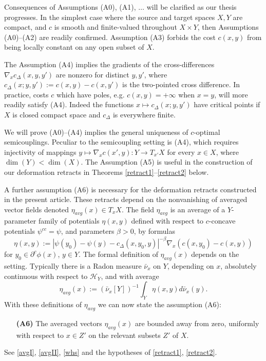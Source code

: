\documentclass[12pt]{amsart}
\theoremstyle{definition}
\theoremstyle{remark}
\newcommand{\del}{\partial}
\newcommand{\cd}{c_\Delta}
\begin{document}
Consequences of Assumptions (A0), (A1), $\ldots$ will be clarified as our thesis progresses. In the simplest case where the source and target spaces $X,Y$ are compact, and $c$ is smooth and finite-valued throughout $X\times Y$, then Assumptions (A0)--(A2) are readily confirmed. Assumption (A3) forbids the cost $c(x,y)$ from being locally constant on any open subset of $X$. 

The Assumption (A4) implies the gradients of the cross-differences $\nabla_x \cd(x,y,y')$ are nonzero for distinct $y,y'$, where $\cd(x;y, y'):=c(x,y)-c(x,y')$ is the two-pointed cross difference. In practice, costs $c$ which have poles, e.g. $c(x,y)=+\infty$ when $x=y$, will more readily satisfy (A4). Indeed the functions $x\mapsto \cd(x;y, y')$ have critical points if $X$ is closed compact space and $\cd$ is everywhere finite. 

We will prove (A0)--(A4) implies the general uniqueness of $c$-optimal semicouplings. Peculiar to the semicoupling setting is (A4), which requires injectivity of mappings $y\mapsto \nabla_x c(x',y):Y\to T_{x'} X$ for every $x\in X$, where $\dim(Y)< \dim(X)$. The Assumption (A5) is useful in the construction of our deformation retracts in Theorems \ref{retract1}--\ref{retract2} below. 

A further assumption (A6) is necessary for the deformation retracts constructed in the present article. These retracts depend on the nonvanishing of averaged vector fields denoted $\eta_{avg}(x) \in T_x X$. The field $\eta_{avg}$ is an average of a $Y$-parameter family of potentials $\eta(x,y)$ defined with respect to $c$-concave potentials $\psi^{cc}=\psi$, and parameters $\beta>0$, by formulas\begin{equation}\label{introetaavg}
\eta(x,y):=|\psi(y_0)-\psi(y)-\cd(x,y_0,y)|^{-\beta} \nabla_x (c(x,y_0)-c(x,y)) 
\end{equation} for $y_0\in \del^c \phi(x)$, $y\in Y$. %
The formal definition of $\eta_{avg}(x)$ depends on the setting. Typically there is a Radon measure $\bar{\nu}_x$ on $Y$, depending on $x$, absolutely continuous with respect to $\mathscr{H}_Y$, and with average \begin{equation}\label{introavg}
\eta_{avg}(x):=(\bar{\nu}_x[Y])^{-1} \int_Y \eta(x,y)d\bar{\nu}_x(y).
\end{equation}
With these definitions of $\eta_{avg}$ we can now state the assumption (A6): 
\begin{itemize}
\item[\textbf{(A6)}] 
The averaged vectors $\eta_{avg}(x)$ are bounded away from zero, uniformly with respect to $x\in Z'$ on the relevant subsets $Z'$ of $X$.
\end{itemize}
See \eqref{avgI}, \eqref{avgII}, \ref{whs} and the hypotheses of \ref{retract1}, \ref{retract2}. 
\end{document}
